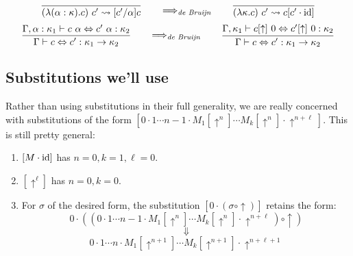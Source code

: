 \begin{judgment}
\[
  \vcenter{
    \infer{(\lambda (\alpha : \kappa). c)~c' \leadsto [c'/\alpha] c}{}
  }
  \qquad
  \Longrightarrow_\emph{de Bruijn}
  \qquad
  \vcenter{
    \infer{(\lambda \kappa.c)~c' \leadsto c[ c' \cdot \id]}{}
  }
\]
\[
  \vcenter{
    \infer
      {\Gamma \vdash c \Leftrightarrow c' : \kappa_1 \rightarrow \kappa_2}
      {\Gamma, \alpha : \kappa_1 \vdash c~\alpha \Leftrightarrow c'~\alpha : \kappa_2}
  }
  \qquad
  \Longrightarrow_\emph{de Bruijn}
  \qquad
  \vcenter{
    \infer
      {\Gamma \vdash c \Leftrightarrow c' : \kappa_1 \rightarrow \kappa_2}
      {\Gamma, \kappa_1 \vdash c[\uparrow]~0 \Leftrightarrow c'[\uparrow]~0 : \kappa_2}
  }
\]
\end{judgment}

\subsection{Substitutions we'll use}
Rather than using substitutions in their full generality, we are really concerned with substitutions
of the form $[ 0 \cdot 1 \cdots n-1 \cdot M_1[\uparrow^n] \cdots M_k[\uparrow^n] \cdot \uparrow^{n+\ell}]$.
This is still pretty general:
\begin{enumerate}[1.]
  \item $[M \cdot \operatorname{id}]$ has $n = 0, k = 1, \ell = 0$.
  \item $[ \uparrow^\ell ]$ has $n = 0, k = 0$.
  \item For $\sigma$ of the desired form, the substitution $[0 \cdot (\sigma \circ \uparrow)]$ retains the form:
    $$0 \cdot (( 0 \cdot 1 \cdots n-1 \cdot M_1[\uparrow^n] \cdots M_k[\uparrow^n] \cdot \uparrow^{n+\ell}) \circ \uparrow)$$
    $$\Downarrow$$
    $$0 \cdot 1 \cdots n \cdot M_1[\uparrow^{n+1}] \cdots M_k[\uparrow^{n+1}] \cdot \uparrow^{n+\ell+1}$$
\end{enumerate}

